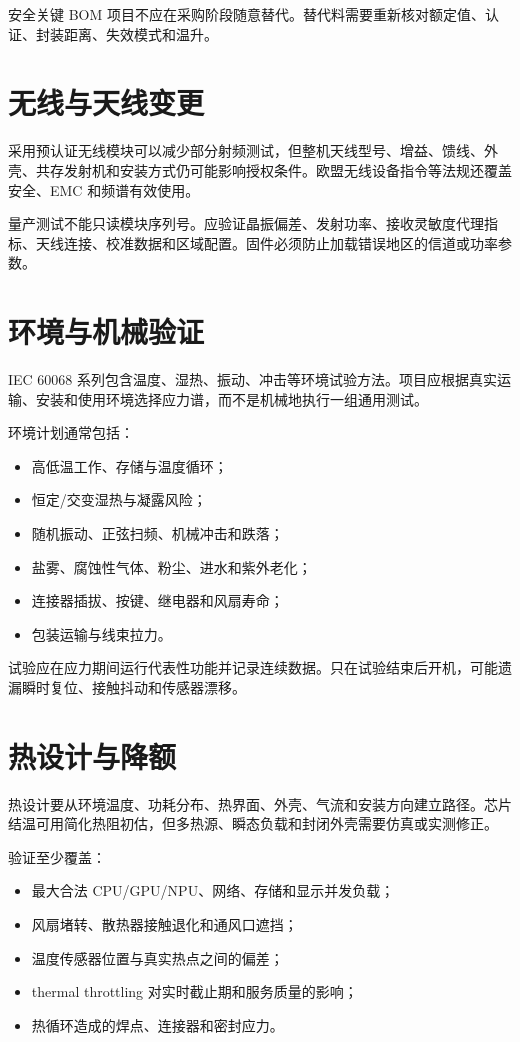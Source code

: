 安全关键 BOM 项目不应在采购阶段随意替代。替代料需要重新核对额定值、认证、封装距离、失效模式和温升。

\section{无线与天线变更}

采用预认证无线模块可以减少部分射频测试，但整机天线型号、增益、馈线、外壳、共存发射机和安装方式仍可能影响授权条件。欧盟无线设备指令等法规还覆盖安全、EMC 和频谱有效使用\cite{eu-red}。

量产测试不能只读模块序列号。应验证晶振偏差、发射功率、接收灵敏度代理指标、天线连接、校准数据和区域配置。固件必须防止加载错误地区的信道或功率参数。

\section{环境与机械验证}

IEC 60068 系列包含温度、湿热、振动、冲击等环境试验方法\cite{iec60068-series}。项目应根据真实运输、安装和使用环境选择应力谱，而不是机械地执行一组通用测试。

环境计划通常包括：
\begin{itemize}
  \item 高低温工作、存储与温度循环；
  \item 恒定/交变湿热与凝露风险；
  \item 随机振动、正弦扫频、机械冲击和跌落；
  \item 盐雾、腐蚀性气体、粉尘、进水和紫外老化；
  \item 连接器插拔、按键、继电器和风扇寿命；
  \item 包装运输与线束拉力。
\end{itemize}

试验应在应力期间运行代表性功能并记录连续数据。只在试验结束后开机，可能遗漏瞬时复位、接触抖动和传感器漂移。

\section{热设计与降额}

热设计要从环境温度、功耗分布、热界面、外壳、气流和安装方向建立路径。芯片结温可用简化热阻初估，但多热源、瞬态负载和封闭外壳需要仿真或实测修正。

验证至少覆盖：
\begin{itemize}
  \item 最大合法 CPU/GPU/NPU、网络、存储和显示并发负载；
  \item 风扇堵转、散热器接触退化和通风口遮挡；
  \item 温度传感器位置与真实热点之间的偏差；
  \item thermal throttling 对实时截止期和服务质量的影响；
  \item 热循环造成的焊点、连接器和密封应力。
\end{itemize}

